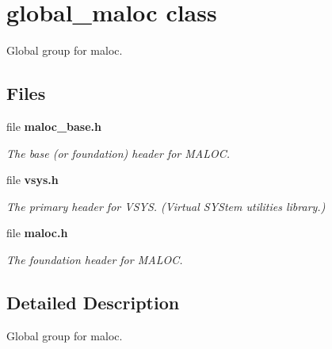 \section{global\-\_\-maloc class}
\label{a00023}


Global group for maloc.  


\subsection*{Files}
\begin{DoxyCompactItemize}
\item 
file {\bf maloc\-\_\-base.\-h}
\begin{DoxyCompactList}\small\item\em The base (or foundation) header for M\-A\-L\-O\-C. \end{DoxyCompactList}\item 
file {\bf vsys.\-h}
\begin{DoxyCompactList}\small\item\em The primary header for V\-S\-Y\-S. (Virtual S\-Y\-Stem utilities library.) \end{DoxyCompactList}\item 
file {\bf maloc.\-h}
\begin{DoxyCompactList}\small\item\em The foundation header for M\-A\-L\-O\-C. \end{DoxyCompactList}\end{DoxyCompactItemize}


\subsection{Detailed Description}
Global group for maloc. 